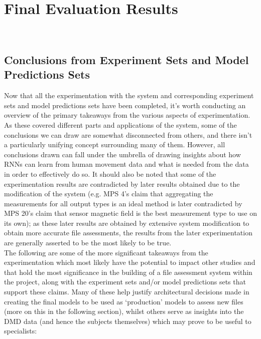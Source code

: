 \documentclass[12pt,twoside]{report}
\begin{document}
\chapter{Final Evaluation Results\\~\\}

\section{Conclusions from Experiment Sets and Model Predictions Sets}

\quad Now that all the experimentation with the system and corresponding experiment sets and model predictions sets have been completed, it’s worth conducting an overview of the primary takeaways from the various aspects of experimentation. As these covered different parts and applications of the system, some of the conclusions we can draw are somewhat disconnected from others, and there isn’t a particularly unifying concept surrounding many of them. However, all conclusions drawn can fall under the umbrella of drawing insights about how RNNs can learn from human movement data and what is needed from the data in order to effectively do so. It should also be noted that some of the experimentation results are contradicted by later results obtained due to the modification of the system (e.g. MPS 4’s claim that aggregating the measurements for all output types is an ideal method is later contradicted by MPS 20’s claim that sensor magnetic field is the best measurement type to use on its own); as these later results are obtained by extensive system modification to obtain more accurate file assessments, the results from the later experimentation are generally asserted to be the most likely to be true.\\

\quad The following are some of the more significant takeaways from the experimentation which most likely have the potential to impact other studies and that hold the most significance in the building of a file assessment system within the project, along with the experiment sets and/or model predictions sets that support these claims. Many of these help justify architectural decisions made in creating the final models to be used as ‘production’ models to assess new files (more on this in the following section), whilst others serve as insights into the DMD data (and hence the subjects themselves) which may prove to be useful to specialists:
\end{document}
